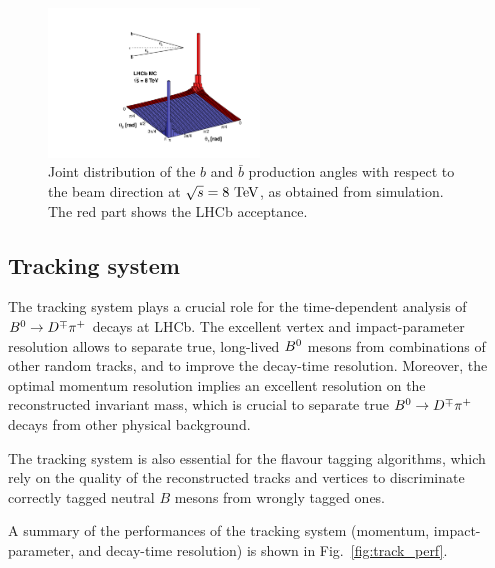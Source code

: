 \begin{figure}[htbp]
  \begin{center}
    \includegraphics[width=0.5\textwidth]{02LHCb/figs/angles.pdf}
  \end{center}
  \vspace{-2mm}
  \caption{Joint distribution of the $b$ and $\bar b$ production angles with respect to the beam direction at $\sqrt{s}=8\rm~TeV$, as obtained from simulation. The red part shows the LHCb acceptance.}
  \label{fig:angles}
\end{figure}

\subsection{Tracking system}
\label{sec:tracking}

The tracking system plays a crucial role for the time-dependent analysis of $B^0\rightarrow D^\mp\pi^+$ decays at LHCb.
The excellent vertex and impact-parameter resolution allows to separate true, long-lived $B^0$ mesons from combinations of
other random tracks, and to improve the decay-time resolution.
Moreover, the optimal momentum resolution implies an excellent resolution on the reconstructed invariant mass, which is crucial
to separate true $B^0\rightarrow D^\mp\pi^+$ decays from other physical background.

The tracking system is also essential for the flavour tagging algorithms, which rely on the quality of the reconstructed tracks and
vertices to discriminate correctly tagged neutral $B$ mesons from wrongly tagged ones.

A summary of the performances of the tracking system (momentum, impact-parameter, and decay-time resolution) is shown in Fig.~\ref{fig:track_perf}.

